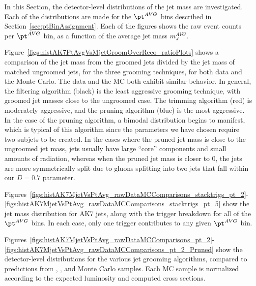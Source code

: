 \label{sec:rawDataMCComparisons}
\label{sec:dijetresults}

\ifnpas
In this Section, the detector-level distributions of the jet mass
are investigated. Each of the distributions are made for 
the $\pt^{AVG}$ bins described in Section~\ref{sec:ptBinAssignment}. 
Each of the figures shows the raw event counts per $\pt^{AVG}$ bin,
as a function of the average jet mass $m_J^{AVG}$. 


Figure~\ref{figs:histAK7PtAvgVsMjetGroomOverReco_ratioPlots}
shows a comparison of the jet mass from the groomed jets
divided by the jet mass of matched ungroomed jets, for the
three grooming techniques, for both data and the \PYTHIA Monte Carlo. 
The data and the MC both exhibit similar behavior. In general,
the filtering algorithm (black) is the least aggressive grooming technique,
with groomed jet masses close to the ungroomed case.
The trimming algorithm (red) is moderately aggressive, and the
pruning algorithm (blue) is the most aggressive. In the case of
the pruning algorithm, a bimodal distribution begins to manifest,
which is typical of this algorithm since the parameters we have
chosen require two subjets to be created. In the cases where
the pruned jet mass is close to the ungroomed jet mass, 
jets usually have large ``core'' components
and small amounts of radiation, whereas when the pruned jet
mass is closer to 0, the jets are more symmetrically split
due to gluons splitting into two jets that fall within
our $D=0.7$ parameter. 
\fi

\ifnpas
Figures~\ref{figs:histAK7MjetVsPtAvg_rawDataMCComparisons_stacktrigs_pt_2}-
\ref{figs:histAK7MjetVsPtAvg_rawDataMCComparisons_stacktrigs_pt_5}
show the jet mass distribution for AK7 jets, along with
the trigger breakdown for all of the $\pt^{AVG}$ bins. In each case,
only one trigger contributes to any given $\pt^{AVG}$ bin. 


Figures~\ref{figs:histAK7MjetVsPtAvg_rawDataMCComparisons_pt_2}-
\ref{figs:histAK7MjetVsPtAvg_rawDataMCComparisons_pt_2_Pruned}
show the detector-level distributions for the various jet grooming
algorithms, compared to predictions from \PYTHIA, , and
\HERWIG Monte Carlo samples. Each MC sample is normalized
according to the expected luminosity and computed cross sections. 
\fi

\ifnpas

